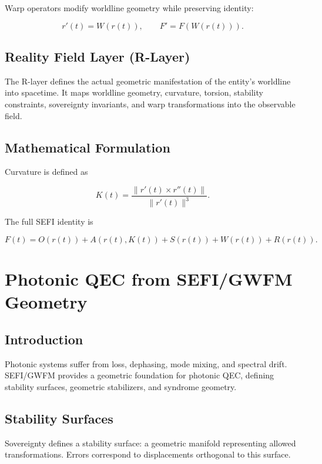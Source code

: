 \documentclass[12pt]{report}
\begin{document}
Warp operators modify worldline geometry while preserving identity:


\[
r'(t) = W(r(t)), \qquad F' = F(W(r(t))).
\]



\section{Reality Field Layer (R-Layer)}

The R-layer defines the actual geometric manifestation of the entity's worldline
into spacetime. It maps worldline geometry, curvature, torsion, stability
constraints, sovereignty invariants, and warp transformations into the observable
field.

\section{Mathematical Formulation}

Curvature is defined as


\[
K(t) = \frac{\| r'(t) \times r''(t) \|}{\| r'(t) \|^3}.
\]



The full SEFI identity is


\[
F(t) = O(r(t)) + A(r(t), K(t)) + S(r(t)) + W(r(t)) + R(r(t)).
\]



\chapter{Photonic QEC from SEFI/GWFM Geometry}

\section{Introduction}

Photonic systems suffer from loss, dephasing, mode mixing, and spectral drift.
SEFI/GWFM provides a geometric foundation for photonic QEC, defining stability
surfaces, geometric stabilizers, and syndrome geometry.

\section{Stability Surfaces}

Sovereignty defines a stability surface: a geometric manifold representing allowed
transformations. Errors correspond to displacements orthogonal to this surface.
\end{document}
